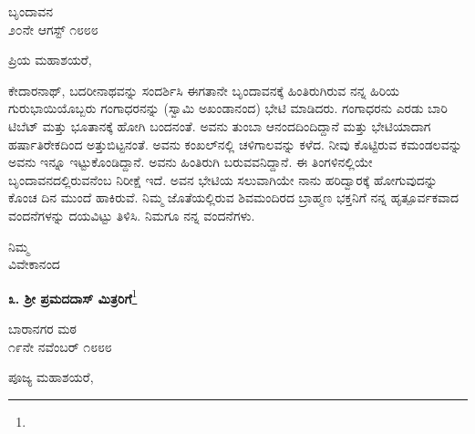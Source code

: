 \vspace{-0.5cm}

\begin{flushright}
ಬೃಂದಾವನ\\೨೦ನೇ ಆಗಸ್ಟ್ ೧೮೮೮
\end{flushright}

\noindent
ಪ್ರಿಯ ಮಹಾಶಯರೆ,

ಕೇದಾರನಾಥ್, ಬದರೀನಾಥವನ್ನು ಸಂದರ್ಶಿಸಿ ಈಗತಾನೇ ಬೃಂದಾವನಕ್ಕೆ ಹಿಂತಿರುಗಿರುವ ನನ್ನ ಹಿರಿಯ ಗುರುಭಾಯಿಯೊಬ್ಬರು ಗಂಗಾಧರನನ್ನು (ಸ್ವಾಮಿ ಅಖಂಡಾನಂದ) ಭೇಟಿ ಮಾಡಿದರು. ಗಂಗಾಧರನು ಎರಡು ಬಾರಿ ಟಿಬೆಟ್ ಮತ್ತು ಭೂತಾನಕ್ಕೆ ಹೋಗಿ ಬಂದನಂತೆ. ಅವನು ತುಂಬಾ ಆನಂದದಿಂದಿದ್ದಾನೆ ಮತ್ತು ಭೇಟಿಯಾದಾಗ ಹರ್ಷಾತಿ\break  ರೇಕದಿಂದ ಅತ್ತುಬಿಟ್ಟನಂತೆ. ಅವನು ಕಂಖಲ್‌ನಲ್ಲಿ ಚಳಿಗಾಲವನ್ನು ಕಳೆದ. ನೀವು ಕೊಟ್ಟಿರುವ ಕಮಂಡಲವನ್ನು ಅವನು ಇನ್ನೂ ಇಟ್ಟುಕೊಂಡಿದ್ದಾನೆ. ಅವನು ಹಿಂತಿರುಗಿ ಬರುವವನಿದ್ದಾನೆ. ಈ ತಿಂಗಳಿನಲ್ಲಿಯೇ ಬೃಂದಾವನದಲ್ಲಿರುವನೆಂಬ ನಿರೀಕ್ಷೆ ಇದೆ. ಅವನ ಭೇಟಿಯ ಸಲುವಾಗಿಯೇ ನಾನು ಹರಿದ್ವಾರಕ್ಕೆ ಹೋಗುವುದನ್ನು ಕೊಂಚ ದಿನ ಮುಂದೆ ಹಾಕಿರುವೆ. ನಿಮ್ಮ ಜೊತೆಯಲ್ಲಿರುವ ಶಿವಮಂದಿರದ ಬ್ರಾಹ್ಮಣ ಭಕ್ತನಿಗೆ ನನ್ನ ಹೃತ್ಪೂರ್ವಕವಾದ ವಂದನೆಗಳನ್ನು ದಯವಿಟ್ಟು ತಿಳಿಸಿ. ನಿಮಗೂ ನನ್ನ ವಂದನೆಗಳು.

\vspace{-0.3cm}

\begin{flushright}
ನಿಮ್ಮ\\ವಿವೇಕಾನಂದ
\end{flushright}

\vspace{-0.4cm}

\begin{center}
\textbf{೩. ಶ‍್ರೀ ಪ್ರಮದದಾಸ್ ಮಿತ್ರರಿಗೆ}\footnote{}\\  {\fontsize{11pt}{11pt}\selectfont{ಶ‍್ರೀ ರಾಮಕೃಷ್ಣರಿಗೆ ಅನಂತಾನಂತ ಪ್ರಣಾಮಗಳು.}}
\end{center}

\vspace{-0.4cm}

\begin{flushright}
ಬಾರಾನಗರ ಮಠ\\೧೯ನೇ ನವೆಂಬರ್ ೧೮೮೮
\end{flushright}

\noindent
ಪೂಜ್ಯ ಮಹಾಶಯರೆ,

